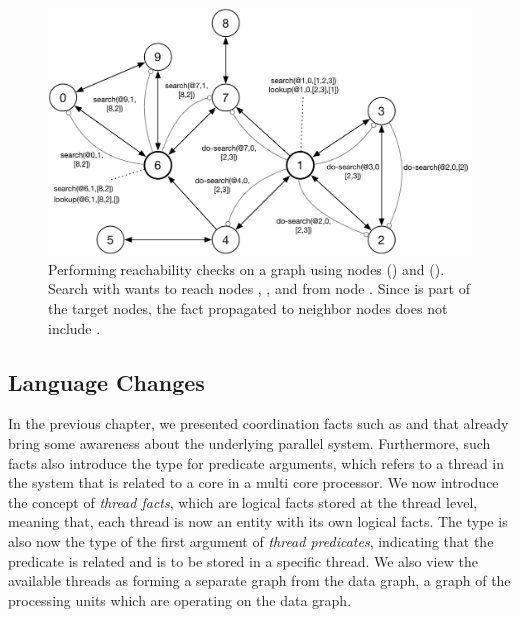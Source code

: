 \begin{figure}[ht]
\begin{center}
   \includegraphics[width=0.9\linewidth]{figures/threads/reach.pdf}
\end{center}

\caption{Performing reachability checks on a graph using nodes 
() and  ().  Search with  wants
to reach nodes , , and  from node . Since
 is part of the target nodes, the fact  propagated to
neighbor nodes does not include .}

\label{fig:threads:reach_example}
\end{figure}

\subsection{Language Changes}

In the previous chapter, we presented coordination facts such as
 and  that already bring some awareness about
the underlying parallel system. Furthermore, such facts also introduce the
 type for predicate arguments, which refers to a thread in the
system that is related to a core in a multi core processor. We now introduce the
concept of \emph{thread facts}, which are logical facts stored at the thread
level, meaning that, each thread is now an entity with its own logical facts.
The type  is also now the type of the first argument of
\emph{thread predicates}, indicating that the predicate is related and is to be
stored in a specific thread. We also view the available threads as forming a
separate graph from the data graph, a graph of the processing units which are
operating on the data graph.

